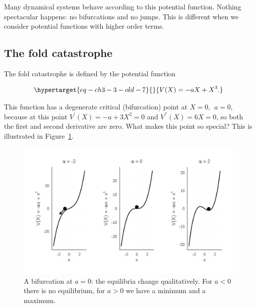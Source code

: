 \documentclass[
  a4paper,
  DIV=11,
  numbers=noendperiod]{scrreprt}
\begin{document}
Many dynamical systems behave according to this potential function.
Nothing spectacular happens: no bifurcations and no jumps. This is
different when we consider potential functions with higher order terms.

\hypertarget{sec-The-fold-catastrophe}{%
\subsection{The fold catastrophe}\label{sec-The-fold-catastrophe}}

The fold catastrophe is defined by the potential function

\begin{equation}\protect\hypertarget{eq-ch3-3-old-7}{}{
V(X) = {- aX + X}^{3}.
}\label{eq-ch3-3-old-7}\end{equation}

This function has a degenerate critical (bifurcation) point at
\(X = 0,\ \ a = 0\), because at this point
\(V^{'}(X) = - a + 3X^{2} = 0\) and \(V^{''}(X) = 6X = 0\), so both the
first and second derivative are zero. What makes this point so special?
This is illustrated in Figure~\ref{fig-ch3-img4-old-16}.

\begin{figure}

{\centering \includegraphics{media/ch3/fig-ch3-img4-old-16.jpg}

}

\caption{\label{fig-ch3-img4-old-16}A bifurcation at \(a = 0\): the
equilibria change qualitatively. For \(a<0\) there is no equilibrium,
for \(a>0\) we have a minimum and a maximum.}

\end{figure}
\end{document}
